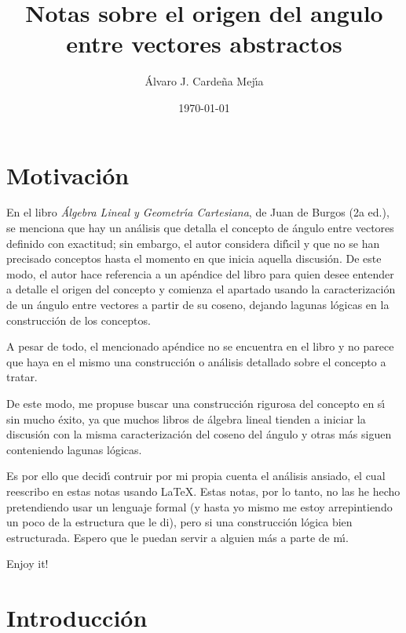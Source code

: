 \documentclass[a4paper,11pt]{article}
\title{Notas sobre el origen del angulo entre vectores abstractos}
\author{\'Alvaro J. Carde\~na Mej\'{\i}a}
\date{\today}
\theoremstyle{teoremas}
\theoremstyle{ejemplos}
\theoremstyle{definiciones}
\theoremstyle{lemas}
\begin{document}
\maketitle

\section{Motivaci\'on}

En el libro \textit{\'Algebra Lineal y Geometr\'{\i}a Cartesiana}, de Juan de Burgos (2a ed.), se menciona que hay un an\'alisis que detalla el concepto de \'angulo entre vectores definido con exactitud; sin embargo, el autor considera dif\'{\i}cil y que no se han precisado conceptos hasta el momento en que inicia aquella discusi\'on. De este modo, el autor hace referencia a un ap\'endice del libro para quien desee entender a detalle el origen del concepto y comienza el apartado usando la caracterizaci\'on de un \'angulo entre vectores a partir de su coseno, dejando lagunas l\'ogicas en la construcci\'on de los conceptos.
\par 
A pesar de todo, el mencionado ap\'endice no se encuentra en el libro y no parece que haya en el mismo una construcci\'on o an\'alisis detallado sobre el concepto a tratar.
\par
De este modo, me propuse buscar una construcci\'on rigurosa del concepto en s\'{\i} sin mucho \'exito, ya que muchos libros de \'algebra lineal tienden a iniciar la discusi\'on con la misma caracterizaci\'on del coseno del \'angulo y otras m\'as siguen conteniendo lagunas l\'ogicas.
\par 
Es por ello que decid\'{\i} contruir por mi propia cuenta el an\'alisis ansiado, el cual reescribo en estas notas usando \LaTeX.
Estas notas, por lo tanto, no las he hecho pretendiendo usar un lenguaje formal (y hasta yo mismo me estoy arrepintiendo un poco de la estructura que le di), pero si una construcci\'on l\'ogica bien estructurada. Espero que le puedan servir a alguien m\'as a parte de m\'{\i}.
\par
Enjoy it!

\section{Introducci\'on}
\end{document}
